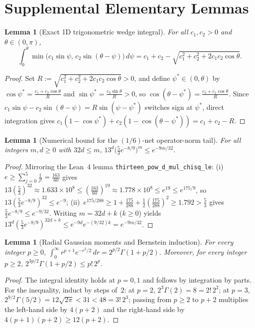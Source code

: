 \documentclass[11pt]{article}
\theoremstyle{plain}
\newtheorem{lemma}[theorem]{Lemma}
\theoremstyle{remark}
\numberwithin{equation}{section}
\begin{document}
\appendix
\section{Supplemental Elementary Lemmas}
\label{app:proofs}

\begin{lemma}[Exact 1D trigonometric wedge integral]
  \label{lem:trig-wedge}
  For all $c_1, c_2 > 0$ and $\theta \in (0, \pi)$,
  \[
    \int_0^\theta \min\bigl(c_1 \sin\psi,\, c_2 \sin(\theta - \psi)\bigr)\,d\psi
    = c_1 + c_2 - \sqrt{c_1^2 + c_2^2 + 2c_1 c_2 \cos\theta}.
  \]
\end{lemma}
\begin{proof}
Set $R := \sqrt{c_1^2 + c_2^2 + 2c_1 c_2 \cos\theta} > 0$, and define $\psi^* \in (0, \theta)$ by $\cos\psi^* = \frac{c_1 + c_2\cos\theta}{R}$ and $\sin\psi^* = \frac{c_2\sin\theta}{R} > 0$, so $\cos(\theta - \psi^*) = \frac{c_2 + c_1\cos\theta}{R}$. Since $c_1\sin\psi - c_2\sin(\theta - \psi) = R\sin(\psi - \psi^*)$ switches sign at $\psi^*$, direct integration gives $c_1(1 - \cos\psi^*) + c_2(1 - \cos(\theta - \psi^*)) = c_1 + c_2 - R$.
\end{proof}

\begin{lemma}[Numerical bound for the $(1/6)$-net operator-norm tail]
  \label{lem:op-num}
  For all integers $m, d \ge 0$ with $32d \le m$, $13^d \bigl(\frac{5}{3}e^{-8/9}\bigr)^m \le e^{-9m/32}$.
\end{lemma}
\begin{proof}
Mirroring the Lean~4 lemma \texttt{thirteen\_pow\_d\_mul\_chisq\_le}: (i)~$e \ge \sum_{j=0}^5 \frac{1}{j!} = \frac{163}{60}$ gives $13(\frac{5}{3})^{32} \approx 1.633 \times 10^8 \le (\frac{163}{60})^{19} \approx 1.778 \times 10^8 \le e^{19} \le e^{175/9}$, so $13(\frac{5}{3}e^{-8/9})^{32} \le e^{-9}$; (ii)~$e^{175/288} \ge 1 + \frac{175}{288} + \frac{1}{2}(\frac{175}{288})^2 \ge 1.792 > \frac{5}{3}$ gives $\frac{5}{3}e^{-8/9} \le e^{-9/32}$. Writing $m = 32d + k$ ($k \ge 0$) yields $13^d(\frac{5}{3}e^{-8/9})^{32d+k} \le e^{-9d}e^{-(9/32)k} = e^{-9m/32}$.
\end{proof}

\begin{lemma}[Radial Gaussian moments and Bernstein induction]
  \label{lem:moment-ind}
  For every integer $p \ge 0$, $\int_0^\infty r^{p+1} e^{-r^2/2}\,dr = 2^{p/2}\Gamma(1 + p/2)$. Moreover, for every integer $p \ge 2$, $2^{3p/2}\Gamma(1 + p/2) \le p!\,2^p$.
\end{lemma}
\begin{proof}
The integral identity holds at $p = 0, 1$ and follows by integration by parts. For the inequality, induct by steps of~$2$: at $p = 2$, $2^3\Gamma(2) = 8 = 2!\,2^2$; at $p = 3$, $2^{9/2}\Gamma(5/2) = 12\sqrt{2\pi} < 31 < 48 = 3!\,2^3$; passing from $p \ge 2$ to $p + 2$ multiplies the left-hand side by $4(p + 2)$ and the right-hand side by $4(p + 1)(p + 2) \ge 12(p + 2)$.
\end{proof}
\end{document}
